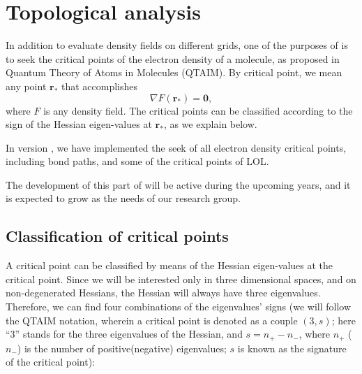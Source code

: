 
\chapter{Topological analysis}\label{sec:topolanalysis}

In addition to evaluate density fields on different grids, one of the purposes of \DTK{} is to seek the critical points of the electron density of a molecule, as proposed in Quantum Theory of Atoms in Molecules (QTAIM). By critical point, we mean any point $\boldsymbol{r}_*$ that accomplishes
%
\begin{equation}
   \nabla F(\boldsymbol{r}_*)=\boldsymbol{0},
\end{equation}
%
where $F$ is any density field. The critical points can be classified according to the sign of the Hessian eigen-values at $\boldsymbol{r}_*$, as we explain below. 

In version \dtkversion, we have implemented the seek of all electron density critical points, including bond paths, and some of the critical points of LOL.

The development of this part of \DTK{} will be active during the upcoming years, and it is expected to grow as the needs of our research group.

\section{Classification of critical points}

A critical point can be classified by means of the Hessian eigen-values at the critical point. Since we will be interested only in three dimensional spaces, and on non-degenerated Hessians, the Hessian will always have three eigenvalues. Therefore, we can find four combinations of the eigenvalues' signs (we will follow the QTAIM notation, wherein a critical point is denoted as a couple $(3,s)$; here ``3'' stands for the three eigenvalues of the Hessian, and $s=n_+-n_-$, where $n_+$ ($n_-$) is the number of positive(negative) eigenvalues; $s$ is known as the signature of the critical point):

